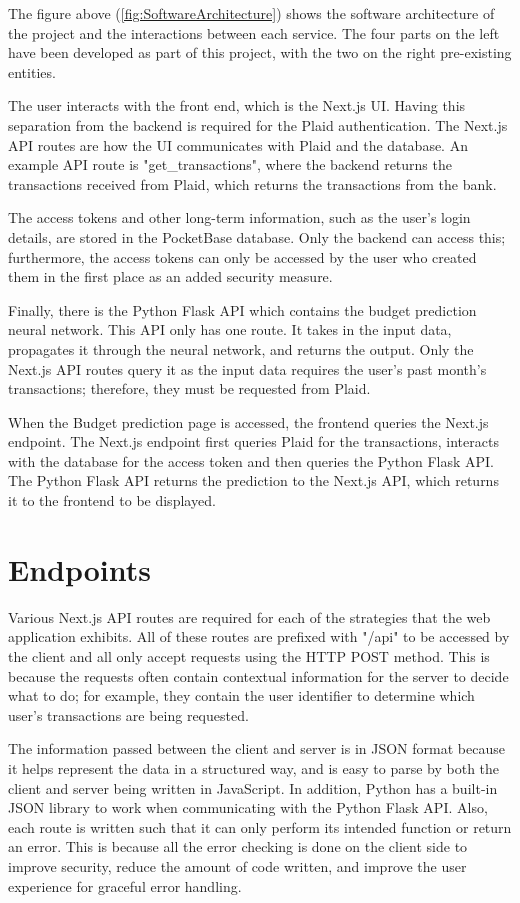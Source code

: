 The figure above (\ref{fig:SoftwareArchitecture}) shows the software architecture of the project and the interactions between each service. The four parts on the left have been developed as part of this project, with the two on the right pre-existing entities.

The user interacts with the front end, which is the Next.js UI. Having this separation from the backend is required for the Plaid authentication. The Next.js API routes are how the UI communicates with Plaid and the database. An example API route is "get\_transactions", where the backend returns the transactions received from Plaid, which returns the transactions from the bank.

The access tokens and other long-term information, such as the user's login details, are stored in the PocketBase database. Only the backend can access this; furthermore, the access tokens can only be accessed by the user who created them in the first place as an added security measure.

Finally, there is the Python Flask API which contains the budget prediction neural network. This API only has one route. It takes in the input data, propagates it through the neural network, and returns the output. Only the Next.js API routes query it as the input data requires the user's past month's transactions; therefore, they must be requested from Plaid.

When the Budget prediction page is accessed, the frontend queries the Next.js endpoint. The Next.js endpoint first queries Plaid for the transactions, interacts with the database for the access token and then queries the Python Flask API. The Python Flask API returns the prediction to the Next.js API, which returns it to the frontend to be displayed.

\section{Endpoints}
\label{sec:endpoints}
Various Next.js API routes are required for each of the strategies that the web application exhibits. All of these routes are prefixed with "/api" to be accessed by the client and all only accept requests using the HTTP POST method. This is because the requests often contain contextual information for the server to decide what to do; for example, they contain the user identifier to determine which user's transactions are being requested.

The information passed between the client and server is in JSON format because it helps represent the data in a structured way, and is easy to parse by both the client and server being written in JavaScript. In addition, Python has a built-in JSON library to work when communicating with the Python Flask API. Also, each route is written such that it can only perform its intended function or return an error. This is because all the error checking is done on the client side to improve security, reduce the amount of code written, and improve the user experience for graceful error handling.

